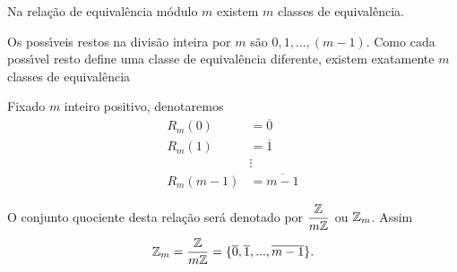 \documentclass{beamer}
\begin{document}
    \begin{frame}    
        \begin{proposicao}
            Na rela{\c c}{\~a}o de equival{\^e}ncia m{\'o}dulo $m$ existem $m$ classes de equival{\^e}ncia.
        \end{proposicao}
        \begin{prova}
            Os poss{\'\i}veis restos na divis{\~a}o inteira por $m$ s{\~a}o $0,1,...,(m-1)$. Como cada poss{\'\i}vel resto define uma classe de equival{\^e}ncia diferente, existem exatamente $m$ classes de equival{\^e}ncia
        \end{prova}
    \end{frame}

    \begin{frame}
        \begin{observacao}
        Fixado $m$ inteiro positivo, denotaremos
        \begin{align*}
            R_{m}(0) &= \overline{0}\\
            R_{m}(1) &= \overline{1}\\
            &\vdots\\
            R_{m}(m-1) &= \overline{m-1}
        \end{align*}

        O conjunto quociente desta rela{\c c}{\~a}o ser{\'a} denotado por $\displaystyle\frac{\mathbb{Z}}{m\mathbb{Z}}$ ou $\mathbb{Z}_m$. Assim
        \[
            \mathbb{Z}_m = \displaystyle\frac{\mathbb{Z}}{m\mathbb{Z}}=\{\overline{0},\overline{1},...,\overline{m-1}\}.
        \]
        \end{observacao}
    \end{frame}
\end{document}
